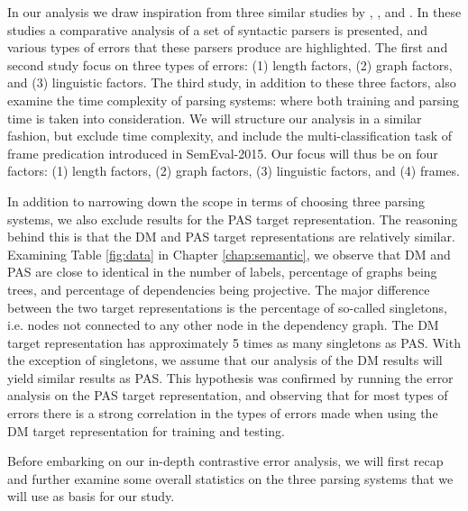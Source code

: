
In our analysis we draw inspiration from three similar studies by , , and . In these studies a comparative analysis of a set of syntactic parsers is presented, and various types of errors that these parsers produce are highlighted. The first and second study focus on three types of errors: (1) length factors, (2) graph factors, and (3) linguistic factors. The third study, in addition to these three factors, also examine the time complexity of parsing systems: where both training and parsing time is taken into consideration. We will structure our analysis in a similar fashion, but exclude time complexity, and include the multi-classification task of frame predication introduced in SemEval-2015. Our focus will thus be on four factors: (1) length factors, (2) graph factors, (3) linguistic factors, and (4) frames.

In addition to narrowing down the scope in terms of choosing three parsing systems, we also exclude results for the PAS target representation. The reasoning behind this is that the DM and PAS target representations are relatively similar. Examining Table \ref{fig:data} in Chapter \ref{chap:semantic}, we observe that DM and PAS are close to identical in the number of labels, percentage of graphs being trees, and percentage of dependencies being projective. The major difference between the two target representations is the percentage of so-called singletons, i.e. nodes not connected to any other node in the dependency graph. The DM target representation has approximately 5 times as many singletons as PAS. With the exception of singletons, we assume that our analysis of the DM results will yield similar results as PAS. This hypothesis was confirmed by running the error analysis on the PAS target representation, and observing that for most types of errors there is a strong correlation in the types of errors made when using the DM target representation for training and testing.

Before embarking on our in-depth contrastive error analysis, we will first recap and further examine some overall statistics on the three parsing systems that we will use as basis for our study.

